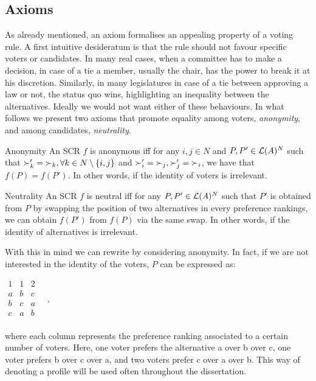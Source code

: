 \subsection{Axioms}
As already mentioned, an axiom formalises an appealing property of a voting rule.
A first intuitive desideratum is that the rule should not favour specific voters or candidates.
In many real cases, when a committee has to make a decision, in case of a tie a member, usually the chair, has the power to break it at his discretion.
Similarly, in many legislatures in case of a tie between approving a law or not, the status quo wins, highlighting an inequality between the alternatives.
Ideally we would not want either of these behaviours. In what follows we present two axioms that promote equality among voters, \textit{anonymity}, and among candidates, \textit{neutrality}. 

	\begin{genthm}{Anonymity}
	An \acs{SCR} $f$ is anonymous iff for any $i,j \in N$ and $P,P'\in\mathcal{L}(A)^{N}$ such that $\mathbin{\succ'_k}=\mathbin{\succ_k}, \forall k \in {N \setminus\{i,j\}}$ and $\mathbin{\succ'_i}=\mathbin{\succ_j}, \mathbin{\succ'_j}=\mathbin{\succ_i}$, we have that $f(P)=f(P')$. In other words, if the identity of voters is irrelevant.
	\end{genthm}

	\begin{genthm}{Neutrality}
	An \acs{SCR} $f$ is neutral iff for any $P,P'\in\mathcal{L}(A)^{N}$ such that $P'$ is obtained from $P$ by swapping the position of two alternatives in every preference rankings, we can obtain $f(P')$ from $f(P)$ via the same swap. In other words, if the identity of alternatives is irrelevant.	
	\end{genthm}

	\begin{example}
		\label{ex:anonymousprofile}
		With this in mind we can rewrite  by considering anonymity. In fact, if we are not interested in the identity of the voters, $P$ can be expressed as:
		\begin{center}
			$
			\begin{array}{ccc}
				1 & 1 & 2 \\
				a &	b & c \\
				b &	c & a \\
				c &	a & b \\
			\end{array} \quad, 
			$
		\end{center}
		where each column represents the preference ranking associated to a certain number of voters. Here, one voter prefers the alternative a over b over c, one voter prefers b over c over a, and two voters prefer c over a over b. 
		This way of denoting a profile will be used often throughout the dissertation.
	\end{example}

